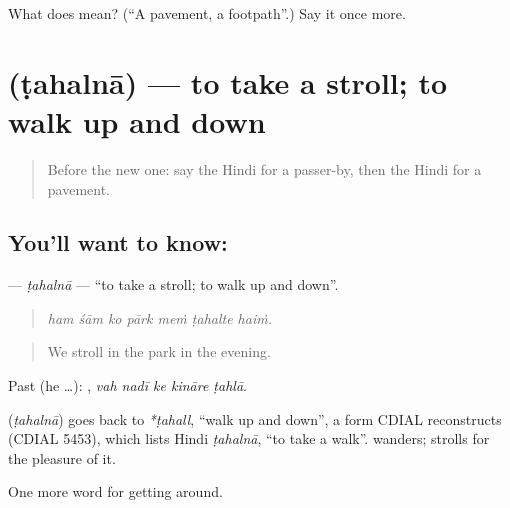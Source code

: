 \begin{tcolorbox}[breakable,colback=teal!4,colframe=teal!35!black,title={Before you move on}]
What does  mean? (\textquotedblleft{}A pavement, a footpath\textquotedblright{}.) Say it once more.
\end{tcolorbox}
\section[\texorpdfstring{\hi{टहलना} (ṭahalnā)}{टहलना (ṭahalnā)}]{ (ṭahalnā) — to take a stroll; to walk up and down}

\label{lesson:HI-C403-tahalna}



\begin{quote}
Before the new one: say the Hindi for a passer-by, then the Hindi for a pavement.
\end{quote}

\subsection*{You'll want to know: }
\textbf{} — \emph{ṭahalnā} — \textquotedblleft{}to take a stroll; to walk up and down\textquotedblright{}.

\begin{quote}
      
\end{quote}

\begin{quote}
\emph{ham śām ko pārk meṁ ṭahalte haiṁ.}
\end{quote}

\begin{quote}
We stroll in the park in the evening.
\end{quote}

Past (he …):     , \emph{vah nadī ke kināre ṭahlā}.

\begin{cousinweb}
\textbf{} (\emph{ṭahalnā}) goes back to \emph{*ṭahall}, \textquotedblleft{}walk up and down\textquotedblright{}, a form CDIAL reconstructs (CDIAL 5453), which lists Hindi \emph{ṭahalnā}, \textquotedblleft{}to take a walk\textquotedblright{}.  wanders;  strolls for the pleasure of it.
\end{cousinweb}

\begin{grammarlens}[title={What you've built}]
One more word for getting around.
\end{grammarlens}


